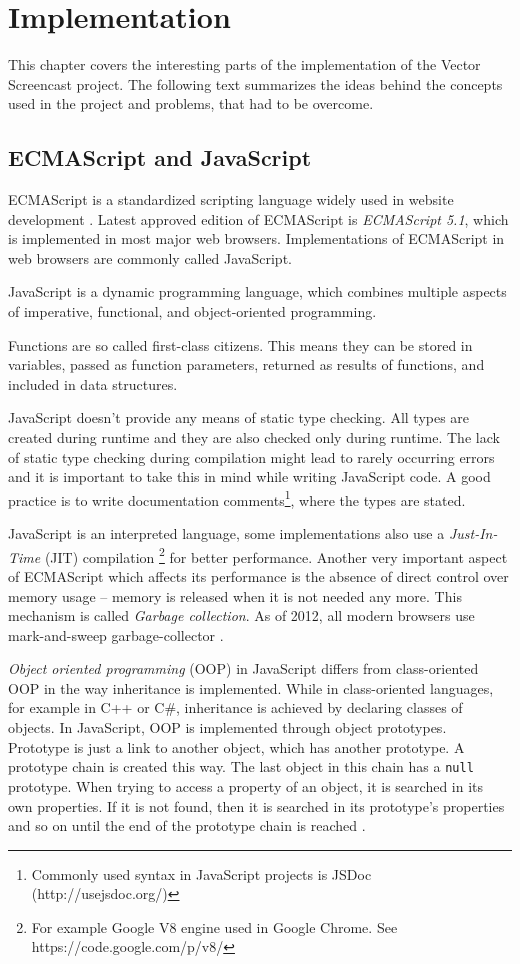\chapter{Implementation}
This chapter covers the interesting parts of the implementation of the Vector Screencast project. The following text summarizes the ideas behind the concepts used in the project and problems, that had to be overcome.

\section{ECMAScript and JavaScript}
ECMAScript is a standardized scripting language widely used in website development \cite{ecmascript}. Latest approved edition of ECMAScript is \textit{ECMAScript 5.1}, which is implemented in most major web browsers. Implementations of ECMAScript in web browsers are commonly called JavaScript. 

JavaScript is a dynamic programming language, which combines multiple aspects of imperative, functional, and object-oriented programming.

Functions are so called first-class citizens. This means they can be stored in variables, passed as function parameters, returned as results of functions, and included in data structures.

JavaScript doesn't provide any means of static type checking. All types are created during runtime and they are also checked only during runtime. The lack of static type checking during compilation might lead to rarely occurring errors and it is important to take this in mind while writing JavaScript code. A good practice is to write documentation comments\footnote{Commonly used syntax in JavaScript projects is JSDoc (http://usejsdoc.org/)}, where the types are stated.

JavaScript is an interpreted language, some implementations also use a  \textit{Just-In-Time} (JIT) compilation \footnote{For example Google V8 engine used in Google Chrome. See https://code.google.com/p/v8/} for better performance.  Another very important aspect of ECMAScript which affects its performance is the absence of direct control over memory usage -- memory is released when it is not needed any more. This mechanism is called \textit{Garbage collection}. As of 2012, all modern browsers use mark-and-sweep garbage-collector \cite{mdn_memory_management}.

\textit{Object oriented programming} (OOP) in JavaScript differs from class-oriented OOP in the way inheritance is implemented. While in class-oriented languages, for example in C++ or C\#, inheritance is achieved by declaring classes of objects. In JavaScript, OOP is implemented through object prototypes. Prototype is just a link to another object, which has another prototype. A prototype chain is created this way. The last object in this chain has a \verb|null| prototype. When trying to access a property of an object, it is searched in its own properties. If it is not found, then it is searched in its prototype's properties and so on until the end of the prototype chain is reached \cite{mdn_prototype_chain}.

